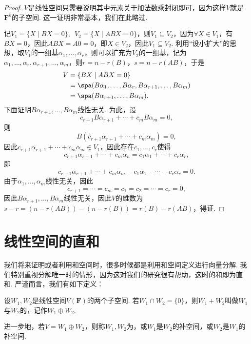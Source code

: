 \begin{proof}
    $V$是线性空间只需要说明其中元素关于加法数乘封闭即可，因为这样$V$就是$\mathbf{F}^k$的子空间. 这一证明非常基本，我们在此略过.

    记$V_1=\{X\mid BX=0\},\enspace V_2=\{X\mid ABX=0\}$，则$V_1\subseteq V_2$，因为$\forall X\in V_1$，有$BX=0$，因此$ABX=A0=0$，即$X\in V_2$，因此$V_1\subseteq V_2$. 利用``设小扩大''的思想，取$V_1$的一组基$\alpha_1,\ldots,\alpha_r$，则可以扩充为$V_2$的一组基，记为$\alpha_1,\ldots,\alpha_r,\alpha_{r+1},\ldots,\alpha_m$，则$r=n-r(B)$，$s=n-r(AB)$，于是
    \begin{align*}
        V & =\{BX\mid ABX=0\}                                                \\
          & =\spa(B\alpha_1,\ldots,B\alpha_r,B\alpha_{r+1},\ldots,B\alpha_m) \\
          & =\spa(B\alpha_{r+1},\ldots,B\alpha_m).
    \end{align*}
    下面证明$B\alpha_{r+1},\ldots,B\alpha_m$线性无关. 为此，设
    \[c_{r+1}B\alpha_{r+1}+\cdots+c_mB\alpha_m=0,\]
    则
    \[B(c_{r+1}\alpha_{r+1}+\cdots+c_m\alpha_m)=0,\]
    因此$c_{r+1}\alpha_{r+1}+\cdots+c_m\alpha_m\in V_1$，因此存在$c_1,\ldots,c_r$使得
    \[c_{r+1}\alpha_{r+1}+\cdots+c_m\alpha_n=c_1\alpha_1+\cdots+c_r\alpha_r,\]
    即
    \[c_{r+1}\alpha_{r+1}+\cdots+c_m\alpha_m-c_1\alpha_1-\cdots-c_r\alpha_r=0.\]
    由于$\alpha_1,\ldots,\alpha_m$线性无关，因此
    \[c_{r+1}=\cdots=c_m=c_1=c_2=\cdots=c_r=0,\]
    因此$B\alpha_{r+1},\ldots,B\alpha_m$线性无关，因此$V$的维数为$s-r=(n-r(AB))-(n-r(B))=r(B)-r(AB)$，得证.
\end{proof}

\section{线性空间的直和}

我们将来证明或者利用和空间时，很多时候都是利用和空间定义进行向量分解. 我们特别重视分解唯一时的情形，因为这对我们的研究很有帮助，这时的和即为直和. 严谨而言，我们有如下定义：
\begin{definition}{}{}
    设$W_1,W_2$是线性空间$V(\mathbf{F})$的两个子空间. 若$W_1 \cap W_2=\{0\}$，则$W_1+W_2$叫做$W_1$与$W_2$的，记作$W_1\oplus W_2$.

    进一步地，若$V=W_1\oplus W_2$，则称$W_1,W_2$为，或$W_1$是$W_2$的补空间，或$W_2$是$W_1$的补空间.
\end{definition}

